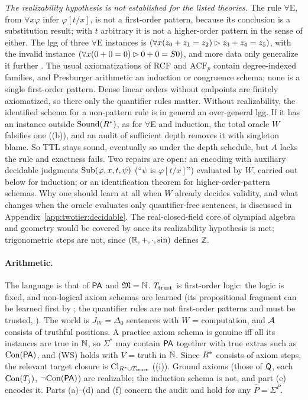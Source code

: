 \emph{The realizability hypothesis is not established for the listed theories.} The rule $\forall$E, from $\forall x\varphi$ infer $\varphi[t/x]$, is not a first-order pattern, because its conclusion is a substitution result; with $t$ arbitrary it is not a higher-order pattern in the sense of \citet{miller1991logic} either. The lgg of three $\forall$E instances is $(\forall x(z_0+z_1=z_2)\rhd z_3+z_4=z_5)$, with the invalid instance $(\forall x(0+0=0)\rhd0+0=S0)$, and more data only generalize it further . The usual axiomatizations of RCF and $\mathrm{ACF}_p$ contain degree-indexed families, and Presburger arithmetic an induction or congruence schema; none is a single first-order pattern. Dense linear orders without endpoints are finitely axiomatized, so there only the quantifier rules matter. Without realizability, the identified schema for a non-pattern rule is in general an over-general lgg. If it has an instance outside $\mathrm{Sound}(R^{*})$, as for $\forall$E and induction, the total oracle $W$ falsifies one ((b)), and an audit of sufficient depth removes it with singleton blame. So TTL stays sound, eventually so under the depth schedule, but $A$ lacks the rule and exactness fails. Two repairs are open: an encoding with auxiliary decidable judgments $\mathrm{Sub}(\varphi,x,t,\psi)$ (``$\psi$ is $\varphi[t/x]$'') evaluated by $W$, carried out below for induction; or an identification theorem for higher-order-pattern schemas. Why one should learn at all when $W$ already decides validity, and what changes when the oracle evaluates only quantifier-free sentences, is discussed in Appendix~\ref{app:twotier:decidable}. The real-closed-field core of olympiad algebra and geometry would be covered by  once its realizability hypothesis is met; trigonometric steps are not, since $(\mathbb{R},+,\cdot,\sin)$ defines $\mathbb Z$.

\paragraph{Arithmetic.} The language is that of $\mathsf{PA}$ and $\mathfrak M=\mathbb{N}$. $T_{\mathrm{trust}}$ is first-order logic: the logic is fixed, and non-logical axiom schemas are learned (its propositional fragment can be learned first by ; the quantifier rules are not first-order patterns and must be trusted, ). The world is $J_W=\Delta_0$ sentences with $W$ = computation, and $\mathcal{A}$ consists of truthful positions. A practice axiom schema is genuine iff all its instances are true in $\mathbb{N}$, so $\Sigma^*$ may contain $\mathsf{PA}$ together with true extras such as $\mathrm{Con}(\mathsf{PA})$, and (WS) holds with $V$ = truth in $\mathbb{N}$. Since $R^{*}$ consists of axiom steps, the relevant target closure is $\mathrm{Cl}_{R^{*}\cup T_{\mathrm{trust}}}$ ((i)). Ground axioms (those of $\mathsf{Q}$, each $\mathrm{Con}(T_j)$, $\neg\mathrm{Con}(\mathsf{PA})$) are realizable; the induction schema is not, and part (e) encodes it. Parts (a)--(d) and (f) concern the audit and hold for any $\hat P=\Sigma^P$.

